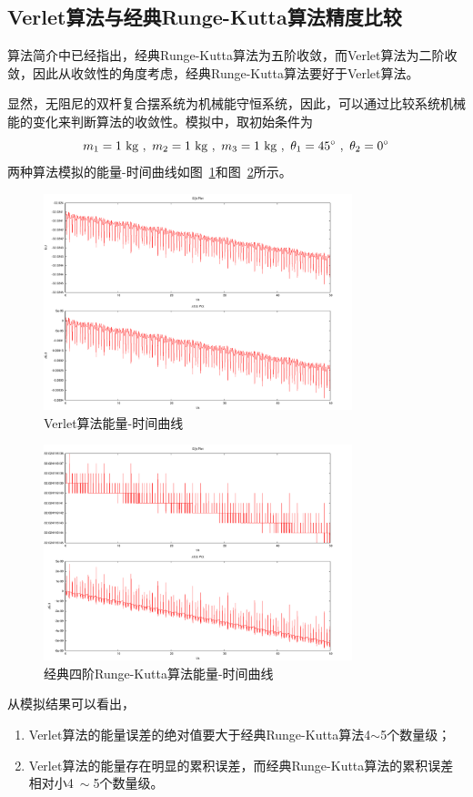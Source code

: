 \documentclass[a4paper,12pt,titlepage]{article}
\begin{document}
\subsection{Verlet算法与经典Runge-Kutta算法精度比较}
算法简介中已经指出，经典Runge-Kutta算法为五阶收敛，而Verlet算法为二阶收敛，因此从收敛性的角度考虑，经典Runge-Kutta算法要好于Verlet算法。

显然，无阻尼的双杆复合摆系统为机械能守恒系统，因此，可以通过比较系统机械能的变化来判断算法的收敛性。模拟中，取初始条件为
\begin{equation}
	m_1=1~\mathrm{kg} ~,~ m_2=1~\mathrm{kg} ~,~ m_3=1~\mathrm{kg} ~,~ \theta_1=45^{\circ} ~,~ \theta_2=0^{\circ} \notag
\end{equation}
两种算法模拟的能量-时间曲线如图~\ref{fig:verletE_2}和图~\ref{fig:RKE_2}所示。
\begin{figure}[H]
\centering
\includegraphics[width=0.8\textwidth]{./verletE_2.pdf}
\caption[Caption for LOF]{Verlet算法能量-时间曲线}
\label{fig:verletE_2}
\end{figure}
\begin{figure}[H]
\centering
\includegraphics[width=0.8\textwidth]{./RKE_2.pdf}
\caption[Caption for LOF]{经典四阶Runge-Kutta算法能量-时间曲线}
\label{fig:RKE_2}
\end{figure}
从模拟结果可以看出，
\begin{enumerate}
	\item Verlet算法的能量误差的绝对值要大于经典Runge-Kutta算法4$\sim$5个数量级；
	\item Verlet算法的能量存在明显的累积误差，而经典Runge-Kutta算法的累积误差相对小4$~\sim$5个数量级。
\end{enumerate}
\end{document}
